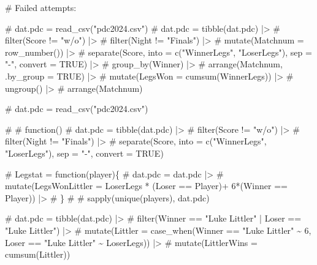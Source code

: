 \documentclass[
]{article}
\newenvironment{Shaded}{\begin{snugshade}}{\end{snugshade}}
\newcommand{\CommentTok}[1]{\textcolor[rgb]{0.37,0.37,0.37}{#1}}
\begin{document}
\begin{Shaded}
\begin{Highlighting}[numbers=left,,]
\CommentTok{\# Failed attempts:}

\CommentTok{\# dat.pdc = read\_csv("pdc2024.csv")}
\CommentTok{\# dat.pdc = tibble(dat.pdc) |\textgreater{}}
\CommentTok{\#   filter(Score != "w/o") |\textgreater{}}
\CommentTok{\#   filter(Night !=  "Finals") |\textgreater{}}
\CommentTok{\#   mutate(Matchnum = row\_number()) |\textgreater{}}
\CommentTok{\#   separate(Score, into = c("WinnerLegs", "LoserLegs"), sep = "{-}", convert = TRUE) |\textgreater{}}
\CommentTok{\#   group\_by(Winner) |\textgreater{}}
\CommentTok{\#   arrange(Matchnum, .by\_group = TRUE) |\textgreater{}}
\CommentTok{\#   mutate(LegsWon = cumsum(WinnerLegs)) |\textgreater{}}
\CommentTok{\#   ungroup() |\textgreater{}}
\CommentTok{\#   arrange(Matchnum)}



\CommentTok{\# dat.pdc = read\_csv("pdc2024.csv")}

\CommentTok{\# \# function()}
\CommentTok{\# dat.pdc = tibble(dat.pdc) |\textgreater{}}
\CommentTok{\#   filter(Score != "w/o") |\textgreater{}}
\CommentTok{\#   filter(Night !=  "Finals") |\textgreater{}}
\CommentTok{\#   separate(Score, into = c("WinnerLegs", "LoserLegs"), sep = "{-}", convert = TRUE)}

\CommentTok{\# Legstat = function(player)\{}
\CommentTok{\#   dat.pdc = dat.pdc |\textgreater{}}
\CommentTok{\#   mutate(LegsWonLittler = LoserLegs * (Loser == Player)+ 6*(Winner == Player)) |\textgreater{}}
\CommentTok{\# \}}
\CommentTok{\# \# sapply(unique(players), dat.pdc)}

\CommentTok{\# dat.pdc = tibble(dat.pdc) |\textgreater{}}
\CommentTok{\#  filter(Winner == "Luke Littler" | Loser == "Luke Littler") |\textgreater{}}
\CommentTok{\#  mutate(Littler = case\_when(Winner == "Luke Littler" \textasciitilde{} 6, Loser == "Luke Littler" \textasciitilde{} LoserLegs)) |\textgreater{}}
\CommentTok{\#  mutate(LittlerWins = cumsum(Littler))}
\end{Highlighting}
\end{Shaded}

\normalsize

\normalsize
\end{document}
